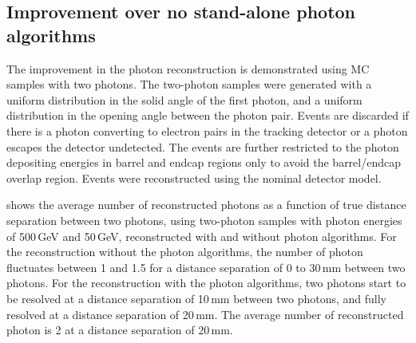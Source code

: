 \subsection{Improvement over no stand-alone photon algorithms}

The improvement in the photon reconstruction is demonstrated using  MC samples with two photons. The two-photon samples were generated with a uniform distribution in the solid angle of the first photon, and a uniform distribution in the opening angle  between the photon pair. Events are discarded if there is a photon converting to electron pairs in the tracking detector or a photon escapes the detector undetected. The events are further restricted to the photon depositing energies in barrel and endcap regions only to avoid the barrel/endcap overlap region. Events were reconstructed using the nominal \ILD detector model.


 shows the average number of reconstructed photons as a function of true distance separation between two photons,   using  two-photon samples
with photon energies of  500\,GeV and 50\,GeV,   reconstructed with and without photon algorithms. For the reconstruction without the photon algorithms, the number of photon fluctuates between 1 and 1.5 for a distance separation of 0 to 30\,mm between two photons.  For the reconstruction with the photon algorithms, two photons start to be resolved at a distance separation  of 10\,mm between two photons, and fully resolved at a  distance separation of 20\,mm.  The average number of reconstructed photon is 2 at a  distance separation of 20\,mm.


